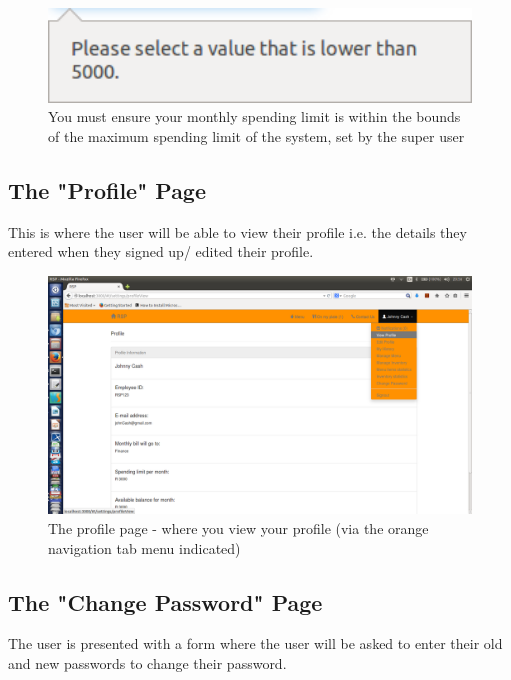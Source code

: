 \documentclass[a4paper,12pt]{report}
\begin{document}
\begin{figure}[H]
  \centering
    \includegraphics[width=1.0\textwidth]{screenshots/limitExeeds.png}
    \caption{You must ensure your monthly spending limit is within the bounds of the maximum spending limit of the system, set by the super user} 
\end{figure}

\subsection{The "Profile" Page} 
This is where the user will be able to view their profile i.e. the details they entered when they signed up/ edited their profile. 

\begin{figure}[H]
  \centering
    \includegraphics[width=1.0\textwidth]{screenshots/viewProfile.png}
    \caption{The profile page - where you view your profile (via the orange navigation tab menu indicated)} 
\end{figure}

\subsection{The "Change Password" Page} 
The user is presented with a form where the user will be asked to enter their old and new passwords to change their password. 
\end{document}
